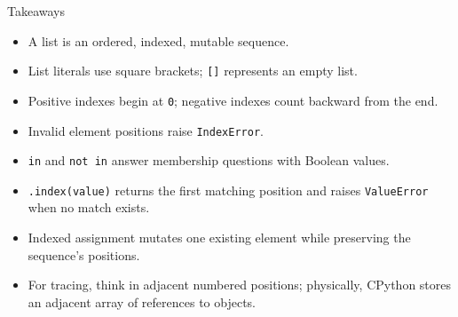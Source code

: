 \documentclass[aspectratio=169,10pt]{beamer}
\begin{document}
\begin{frame}{Takeaways}
  \begin{itemize}
    \item A list is an ordered, indexed, mutable sequence.
    \item List literals use square brackets; \texttt{[]} represents an empty list.
    \item Positive indexes begin at \texttt{0}; negative indexes count backward from the end.
    \item Invalid element positions raise \texttt{IndexError}.
    \item \texttt{in} and \texttt{not in} answer membership questions with Boolean values.
    \item \texttt{.index(value)} returns the first matching position and raises \texttt{ValueError} when no match exists.
    \item Indexed assignment mutates one existing element while preserving the sequence's positions.
    \item For tracing, think in adjacent numbered positions; physically, CPython stores an adjacent array of references to objects.
  \end{itemize}
\end{frame}
\end{document}
